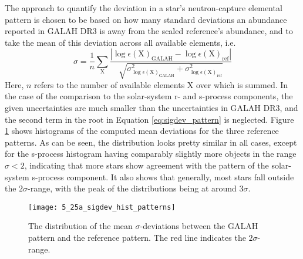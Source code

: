 \documentclass[a4paper,11pt]{article}
\begin{document}
%
The approach to quantify the deviation in a star's neutron-capture elemental pattern is chosen to be based on how many standard deviations an abundance reported in GALAH DR3 is away from the scaled reference's abundance, and to take the mean of this deviation across all available elements, i.e.
%
\begin{equation}\label{eq:sigdev_pattern}
 \sigma=\frac{1}{n}\sum_{\mathrm{X}}\frac{|\log{\epsilon(\mathrm{X})}_\mathrm{GALAH}-\log{\epsilon(\mathrm{X})}_\mathrm{ref}|}{\sqrt{\sigma_{\log{\epsilon(\mathrm{X})}_\mathrm{GALAH}}^2+\sigma_{\log{\epsilon(\mathrm{X})}_\mathrm{ref}}^2}}
\end{equation}
%
Here, $n$ refers to the number of available elements X over which is summed. In the case of the comparison to the solar-system r- and s-process components, the given uncertainties are much smaller than the uncertainties in GALAH DR3, and the second term in the root in Equation \ref{eq:sigdev_pattern} is neglected. Figure \ref{fig:sigdev_hist_patterns} shows histograms of the computed mean deviations for the three reference patterns. As can be seen, the distribution looks pretty similar in all cases, except for the s-process histogram having comparably slightly more objects in the range $\sigma<2$, indicating that more stars show agreement with the pattern of the solar-system s-process component. It also shows that generally, most stars fall outside the $2\sigma$-range, with the peak of the distributions being at around $3\sigma$.
%
\begin{figure}[ht]
 \centering
 \texttt{[image: 5\_25a\_sigdev\_hist\_patterns]}
 \caption[Mean $\sigma$-deviations between GALAH and reference pattern]{The distribution of the mean $\sigma$-deviations between the GALAH pattern and the reference pattern. The red line indicates the $2\sigma$-range.}
 \label{fig:sigdev_hist_patterns}
\end{figure}\\
%
\end{document}
